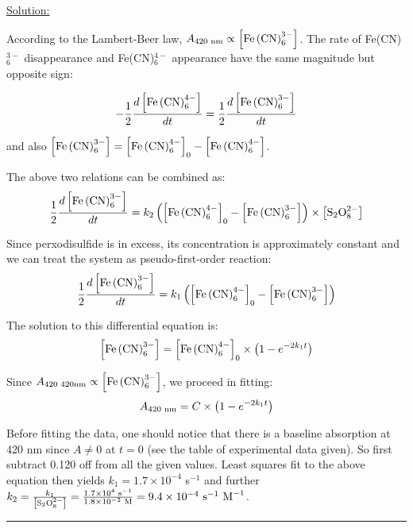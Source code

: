 \noindent
\underline{Solution:}

According to the Lambert-Beer law, $A_{420\textnormal{ nm}} \propto \left[\textnormal{Fe}\left(\textnormal{CN}\right)_6^{3-}\right]$. The rate of Fe(CN)$_6^{3-}$ disappearance and Fe(CN)$_6^{4-}$ appearance have the same magnitude but opposite sign:

$$-\frac{1}{2}\frac{d\left[\textnormal{Fe}\left(\textnormal{CN}\right)_6^{4-}\right]}{dt} = \frac{1}{2}\frac{d\left[\textnormal{Fe}\left(\textnormal{CN}\right)_6^{3-}\right]}{dt}$$

\noindent
and also $\left[\textnormal{Fe}\left(\textnormal{CN}\right)_6^{3-}\right] = \left[\textnormal{Fe}\left(\textnormal{CN}\right)_6^{4-}\right]_0 - \left[\textnormal{Fe}\left(\textnormal{CN}\right)_6^{4-}\right]$.

\noindent
The above two relations can be combined as:
$$\frac{1}{2}\frac{d\left[\textnormal{Fe}\left(\textnormal{CN}\right)_6^{3-}\right]}{dt} = k_2\left(\left[\textnormal{Fe}\left(\textnormal{CN}\right)_6^{4-}\right]_0 - \left[\textnormal{Fe}\left(\textnormal{CN}\right)_6^{3-}\right]\right)\times\left[\textnormal{S}_2\textnormal{O}_8^{2-}\right]$$

\noindent
Since perxodisulfide is in excess, its concentration is approximately constant and we can treat the system as pseudo-first-order reaction:
$$\frac{1}{2}\frac{d\left[\textnormal{Fe}\left(\textnormal{CN}\right)_6^{3-}\right]}{dt} = k_1\left(\left[\textnormal{Fe}\left(\textnormal{CN}\right)_6^{4-}\right]_0 - \left[\textnormal{Fe}\left(\textnormal{CN}\right)_6^{3-}\right]\right)$$

\noindent
The solution to this differential equation is:
$$\left[\textnormal{Fe}\left(\textnormal{CN}\right)_6^{3-}\right] = \left[\textnormal{Fe}\left(\textnormal{CN}\right)_6^{4-}\right]_0\times\left(1 - e^{-2k_1t}\right)$$

\noindent
Since $A_{420\textnormal{ 420nm}} \propto \left[\textnormal{Fe}\left(\textnormal{CN}\right)_6^{3-}\right]$, we proceed in fitting:
$$A_{420\textnormal{ nm}} = C\times\left(1 - e^{-2k_1t}\right)$$

\noindent
Before fitting the data, one should notice that there is a baseline absorption at 420 nm since $A \ne 0$ at $t = 0$ (see the table of experimental data given). So first subtract 0.120 off from all the given values. Least squares fit to the above equation then yields $k_1 = 1.7\times 10^{-4}$ s$^{-1}$ and further $k_2 = \frac{k_1}{\left[\textnormal{S}_2\textnormal{O}_8^{2-}\right]} = \frac{1.7\times 10^4\textnormal{ s}^{-1}}{1.8\times 10^{-2}\textnormal{ M}} = 9.4\times 10^{-4}\textnormal{ s}^{-1}\textnormal{ M}^{-1}$. 

\hrule\vspace{0.5cm}
